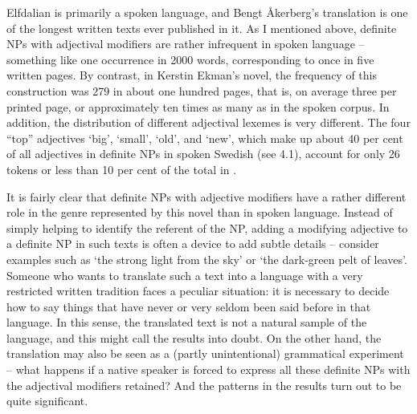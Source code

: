 Elfdalian is primarily a spoken language, and Bengt Åkerberg’s translation is one of the longest written texts ever published in it. As I mentioned above, definite NPs with adjectival modifiers are rather infrequent in spoken language – something like one occurrence in 2000 words, corresponding to once in five written pages. By contrast, in Kerstin Ekman’s novel, the frequency of this construction was 279 in about one hundred pages, that is, on average three per printed page, or approximately ten times as many as in the spoken corpus. In addition, the distribution of different adjectival lexemes is very different. The four “top” adjectives ‘big’,  ‘small’,  ‘old’, and  ‘new’, which make up about 40 per cent of all adjectives in definite NPs in spoken Swedish (see 4.1), account for only 26 tokens or less than 10 per cent of the total in .

It is fairly clear that definite NPs with adjective modifiers have a rather different role in the genre represented by this novel than in spoken language. Instead of simply helping to identify the referent of the NP, adding a modifying adjective to a definite NP in such texts is often a device to add subtle details – consider examples such as  ‘the strong light from the sky’ or  ‘the dark-green pelt of leaves’. Someone who wants to translate such a text into a language with a very restricted written tradition faces a peculiar situation: it is necessary to decide how to say things that have never or very seldom been said before in that language. In this sense, the translated text is not a natural sample of the language, and this might call the results into doubt. On the other hand, the translation may also be seen as a (partly unintentional) grammatical experiment – what happens if a native speaker is forced to express all these definite NPs with the adjectival modifiers retained? And the patterns in the results turn out to be quite significant.

